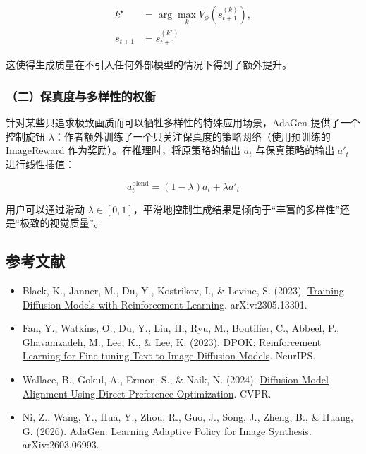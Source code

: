 \[
\begin{aligned}
k^\star &= \arg\max_k V_\phi(s_{t+1}^{(k)}), \\
s_{t+1} &= s_{t+1}^{(k^\star)}
\end{aligned}
\]

这使得生成质量在不引入任何外部模型的情况下得到了额外提升。

\hypertarget{ux4e8cux4fddux771fux5ea6ux4e0eux591aux6837ux6027ux7684ux6743ux8861}{%
\subsubsection{（二）保真度与多样性的权衡}\label{ux4e8cux4fddux771fux5ea6ux4e0eux591aux6837ux6027ux7684ux6743ux8861}}

针对某些只追求极致画质而可以牺牲多样性的特殊应用场景，AdaGen 提供了一个控制旋钮 \(\lambda\)：作者额外训练了一个只关注保真度的策略网络（使用预训练的 ImageReward 作为奖励）。在推理时，将原策略的输出 \(a_t\) 与保真策略的输出 \(a'_t\) 进行线性插值：

\[
a_t^{\mathrm{blend}} = (1 - \lambda)a_t + \lambda a'_t
\]

用户可以通过滑动 \(\lambda \in [0, 1]\)，平滑地控制生成结果是倾向于``丰富的多样性''还是``极致的视觉质量''。

\hypertarget{ux53c2ux8003ux6587ux732e-163}{%
\subsection{参考文献}\label{ux53c2ux8003ux6587ux732e-163}}

\begin{itemize}
\tightlist
\item
  Black, K., Janner, M., Du, Y., Kostrikov, I., \& Levine, S. (2023). \href{https://arxiv.org/abs/2305.13301}{Training Diffusion Models with Reinforcement Learning}. arXiv:2305.13301.
\item
  Fan, Y., Watkins, O., Du, Y., Liu, H., Ryu, M., Boutilier, C., Abbeel, P., Ghavamzadeh, M., Lee, K., \& Lee, K. (2023). \href{https://arxiv.org/abs/2305.16381}{DPOK: Reinforcement Learning for Fine-tuning Text-to-Image Diffusion Models}. NeurIPS.
\item
  Wallace, B., Gokul, A., Ermon, S., \& Naik, N. (2024). \href{https://arxiv.org/abs/2311.12908}{Diffusion Model Alignment Using Direct Preference Optimization}. CVPR.
\item
  Ni, Z., Wang, Y., Hua, Y., Zhou, R., Guo, J., Song, J., Zheng, B., \& Huang, G. (2026). \href{https://arxiv.org/abs/2603.06993}{AdaGen: Learning Adaptive Policy for Image Synthesis}. arXiv:2603.06993.
\end{itemize}

\clearpage
